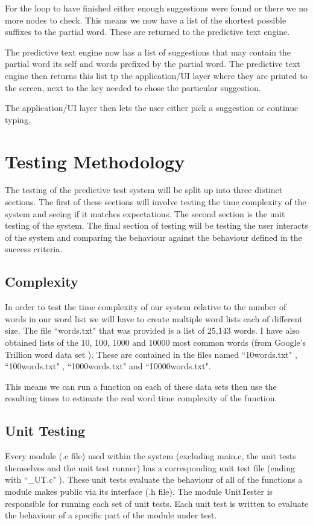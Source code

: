 \documentclass[10pt]{article} %
\begin{document}
            For the loop to have finished either enough suggestions were found or there we no more nodes to check. This means we now have a list of the shortest possible suffixes to the partial word. These are returned to the predictive text engine.
            
            The predictive text engine now has a list of suggestions that may contain the partial word its self and words prefixed by the partial word. The predictive text engine then returns this list tp the application/UI layer where they are printed to the screen, next to the key needed to chose the particular suggestion.
            
            The application/UI layer then lets the user either pick a suggestion or continue typing.
            
    
	\section{Testing Methodology}
	
	    The testing of the predictive test system will be split up into three distinct sections. The first of these sections will involve testing the time complexity of the system and seeing if it matches expectations. The second section is the unit testing of the system. The final section of testing will be testing the user interacts of the system and comparing the behaviour against the behaviour defined in the success criteria.
		\subsection{Complexity}
		    In order to test the time complexity of our system relative to the number of words in our word list we will have to create multiple word lists each of different size. The file ``words.txt" that was provided is a list of 25,143 words. I have also obtained lists of the 10, 100, 1000 and 10000 most common words (from Google's Trillion word data set \cite{github:wordlist:first20hours} ). These are contained in the files named ``10words.txt" , ``100words.txt" , ``1000words.txt" and ``10000words.txt".
		    
		    This means we can run a function on each of these data sets then use the resulting times to estimate the real word time complexity of the function.				

				
		\subsection{Unit Testing} \label{section:unittesting}
		    Every module (.c file) used within the system (excluding main.c, the unit tests themselves and the unit test runner) has a corresponding unit test file (ending with ``\_UT.c" ). These unit tests evaluate the behaviour of all of the functions a module makes public via its interface (.h file). The module UnitTester is responsible for running each set of unit tests. Each unit test is written to evaluate the behaviour of a specific part of the module under test.
		    
\end{document}
